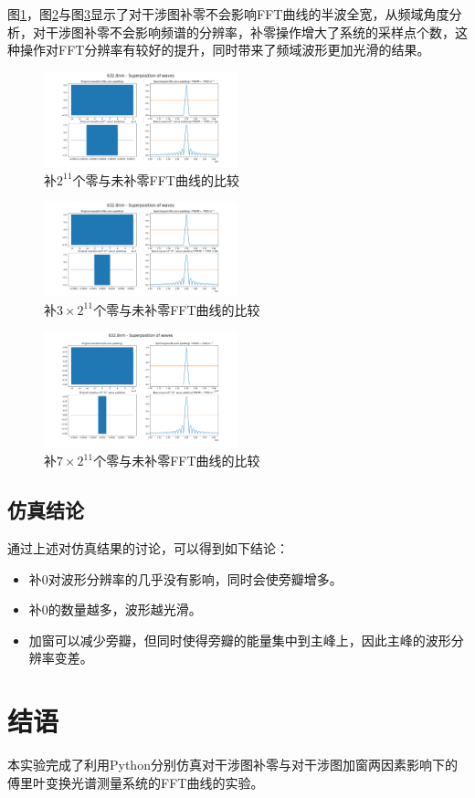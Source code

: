 \documentclass[conference]{IEEEtran}
\begin{document}
图\ref{pic1}，图\ref{pic2}与图\ref{pic3}显示了对干涉图补零不会影响FFT曲线的半波全宽，从频域角度分析，对干涉图补零不会影响频谱的分辨率，补零操作增大了系统的采样点个数，这种操作对FFT分辨率有较好的提升，同时带来了频域波形更加光滑的结果。
\begin{figure}[htbp]
    \centerline{\includegraphics[width=0.5\textwidth]{pic1.png}}
    \caption{补$2^{11}$个零与未补零FFT曲线的比较}
    \label{pic1}
\end{figure}

\begin{figure}[htbp]
    \centerline{\includegraphics[width=0.5\textwidth]{pic2.png}}
    \caption{补$3\times2^{11}$个零与未补零FFT曲线的比较}
    \label{pic2}
\end{figure}

\begin{figure}[htbp]
    \centerline{\includegraphics[width=0.5\textwidth]{pic3.png}}
    \caption{补$7\times2^{11}$个零与未补零FFT曲线的比较}
    \label{pic3}
\end{figure}

\subsection{仿真结论}
通过上述对仿真结果的讨论，可以得到如下结论：
\begin{itemize}
    \item[1)] 补0对波形分辨率的几乎没有影响，同时会使旁瓣增多。
    \item[2)] 补0的数量越多，波形越光滑。
    \item[3)] 加窗可以减少旁瓣，但同时使得旁瓣的能量集中到主峰上，因此主峰的波形分辨率变差。
\end{itemize}



\section{结语}
本实验完成了利用Python分别仿真对干涉图补零与对干涉图加窗两因素影响下的傅里叶变换光谱测量系统的FFT曲线的实验。
\end{document}
